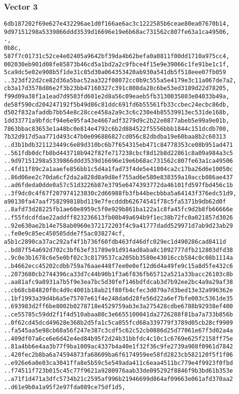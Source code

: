 \documentclass[
]{article}
\begin{document}
\hypertarget{vector-3-2}{%
\subsubsection{Vector 3}\label{vector-3-2}}

\begin{verbatim}
6db187202f69e627e432296ae1d0f166ae6ac3c1222585b6ceae80ea07670b14,
9d97151298a5339866ddd3539d16696e19e6b68ac731562c807fe63a1ca49506,
-,
0b8c,
587f7c01731c52ce4e02405a9642bf39da4b62befa0a0811f00dd1710a975cc4,
002030eb901d08fe85873b46cd5a1bd2a2c9fbce4f15e9e39066c1fe91be1c1f,
5ca9dc5e02e908b5f1de31c85d30a064353420ab930a541db5f518eee07fb059
..323df22d2ce82d36a5bac52aa322f08072cc0b9c555a5e4179e3c11a067de7a2,
cb3a17d3578d86e2f3b23bb47160327c391c808da28c6be53ed3189d22d78205,
f99d09a38f1a1ead7d9503fd601e2d8a56c09eaeb5fb3130035803e04033b49a,
de58f590cd204247192f5b49d86c81ddc691fd6b55561fb33ccbec24ecbc86db,
d502f832afaddb7bb54e8c28cce458a2a9c3c6c230e4b85539913ec531de168b,
1dd33771a9bfdcf94e6e95fa43e4667adf3279d9c2b22e0877abeb5e99a9e01b,
7863bbac83653e1a48bc0e814e4792c6b2d884522f5556bbb1844c151dcdb700,
7b32d917d5aa771d493c47b0e096886827cd056c82dbdba19e60baa8b2c60313
..d3b1bdb321123449c6e89d310bc6b7f654315eb471c84778353ce08b951ad471
..561fdb0dcfb8bd443718b942f82fe717238cbcf8d12b8d22861c8a09a984a3c5
..9d97151298a5339866ddd3539d16696e19e6b68ac731562c807fe63a1ca49506
..4fd11f89c2a1aaefe856bb1c5d4a1fad73f4de5e41804ca2c17ba26d6e10050c
..86d06ee2c70da6cf2da2a828d8a9d8ef755ad6e580e838359a10accb086ae437
..ad6fdeda0dde0a57c51d3226b87e3795e6474393772da46101fd597fbd456c1b
..3f9dc0c4f67f207974123830c2d66988fb3fb44becbbba5a64143f376edc51d9,
a90130fa47aaf758299818bd119e7fecdddb62674541f78c5fa5371b9db62d0f
..8afd73d28225fb1ae60e8959c5f0e929b861ba122a1c8fa45fc9d2b8fb66666e
..f55fdcdfdae22addff823236613fb08b49a694b9f1ec38b72fc0a021857d3026
..92e630ae2b14e758ab0960e372172203f4c9a41777dadd529971d7ab9d23ab29
..fe0e9c85ec450505dde7f5ac038274cf,
a5b1c2890ca37ac292af4f1b736f60fdb463fd46dfc029ec1d490286cad8411d
..bd87f54a692d702c3bf63ef31789e91d914ad8aba8c1092777dfb212803dfd38
..9c0e3b1678c6e5e0bf02c3c8179537ca205bb3580e43016ccb584c0c08b1114a
..b4662ecc45202cdbb759a76aae448f7ee0e0ef12d6d4a49fe9c15a8d5fe432c6
..2073680cb2744396ca33d7c44b90b1f3a6f836fb65712a521a33bacc26103c8b
..aa81afc9a8931a7b5f9e3ea7bc5d30fef146bdfdcab3d7b92ee2bc4a9a29af38
..cb68cb84820f0c4d9c4001b18ab21f80fb4cfec3d079a7d3bed13e32a996362e
..1bf1993a39d4b6a5e75707e61f4e248da6d28fe56d22a6ef7bfe003c5361de35
..693983d2ff6be8002b0278718e4529759ab3e3a275428cdbe6788b92938ef400
..ce55785c59dd2f1f4d510abaa80c3e6655100041da2726288f81ba7a733b856b
..0f62cd45dcd49628e368b2d5fa1c5ca055fcd68a339779f3789d05cb28cf9909
..fa545aa5e98cb68a56f247e387c3cdf5c62c52cb0886d25d77061e67f3d02a4a
..409df07a6ce6e6d42e4ed84b95f2d24b31bbfdc4c10c1c6769e625f2158ff75e
..81a4bb6e4aa3b77f9ba1009ac4337b4a40e1f32f36c9fe2739a908f0961d7842
..420fec2b8ba6a74594873fa68609ba6f6174959ee58fd2823cb582120f5f1f06
..e926e6a0e03ca3041ffa8e5b59c5e549ada411c6eaa4511bc779e4f9923f0fbd
..f74511f723b015c45c77f9621a9280976aab33de095292f8846f9b3bd61b353e
..a71f1d471a3dfc5734b21c2595af996b21946699d864af09663e061afd370aa2
..d61e9b0a1a95f2e97fda089ce75df1d5,
\end{verbatim}
\end{document}
